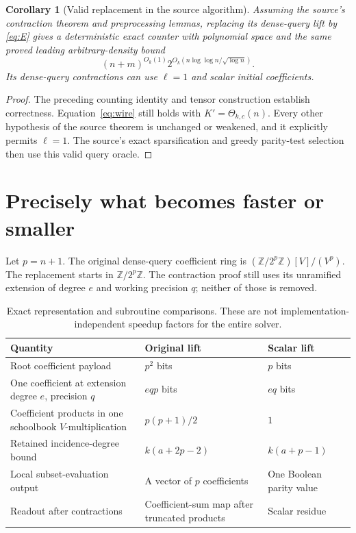 \documentclass[11pt]{article}
\newtheorem{corollary}[theorem]{Corollary}
\theoremstyle{definition}
\theoremstyle{remark}
\newcommand{\Z}{\mathbb Z}
\begin{document}
\begin{corollary}[Valid replacement in the source algorithm]\label{cor:replacement}
Assuming the source's contraction theorem and preprocessing lemmas, replacing
its dense-query lift by \eqref{eq:E} gives a deterministic exact counter with
polynomial space and the same proved leading arbitrary-density bound
\[
 (n+m)^{O_k(1)}2^{O_k(n\log\log n/\sqrt{\log n})}.
\]
Its dense-query contractions can use $\ell=1$ and scalar initial coefficients.
\end{corollary}
\begin{proof}
The preceding counting identity and tensor construction establish correctness.
Equation~\eqref{eq:wire} still holds with $K'=\Theta_{k,c}(n)$. Every
other hypothesis of the source theorem is unchanged or weakened, and it
explicitly permits $\ell=1$. The source's exact sparsification and greedy
parity-test selection then use this valid query oracle.
\end{proof}

\section{Precisely what becomes faster or smaller}\label{sec:resources}

Let $p=n+1$. The original dense-query coefficient ring is
$(\Z/2^p\Z)[V]/(V^p)$. The replacement starts in $\Z/2^p\Z$.
The contraction proof still uses its unramified extension of degree $e$ and
working precision $q$; neither of those is removed.

\begin{table}[ht]
\centering\small
\begin{tabularx}{\textwidth}{@{}p{}XX@{}}
\toprule
Quantity & Original lift & Scalar lift \\
\midrule
Root coefficient payload & $p^2$ bits & $p$ bits \\
One coefficient at extension degree $e$, precision $q$ & $eqp$ bits & $eq$ bits \\
Coefficient products in one schoolbook $V$-multiplication & $p(p+1)/2$ & $1$ \\
Retained incidence-degree bound & $k(a+2p-2)$ & $k(a+p-1)$ \\
Local subset-evaluation output & A vector of $p$ coefficients & One Boolean parity value \\
Readout after contractions & Coefficient-sum map after truncated products & Scalar residue \\
\bottomrule
\end{tabularx}
\caption{Exact representation and subroutine comparisons. These are not
implementation-independent speedup factors for the entire solver.}
\end{table}
\end{document}
